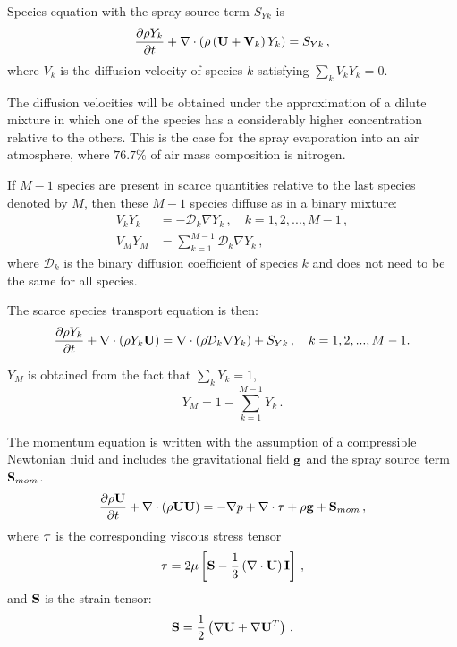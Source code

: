 Species equation with the spray source term $S_{Yk}$ is
\begin{equation}\label{ns: species}
\frac{\partial \rho Y_k }{\partial t} + \nabla \cdot \left( \rho \left( \bv{U} +
\bv{V}_{k}\right) Y_k \right) = S_{Yk} \, ,
\end{equation} where $V_k$ is the diffusion velocity of species $k$ satisfying
$\sum_{k} V_k Y_k = 0$.

The diffusion velocities will be obtained under the approximation of a dilute
mixture in which one of the species has a considerably higher concentration
relative to the others. This is the case for the spray evaporation into an air
atmosphere, where $76.7\%$ of air mass composition is nitrogen.

If $M-1$ species are present in scarce quantities relative to the last species
denoted by $M$, then these $M-1$ species diffuse as in a binary mixture:
\begin{subequations}\label{eq: byndiff}
\begin{align}
V_k Y_k &= -\mathcal{D}_k \nabla Y_k \, , \quad k=1,2,...,M-1 \, ,\\
V_M Y_M &=  \sum_{k=1}^{M-1} \mathcal{D}_k \nabla Y_k \, ,
\end{align}
\end{subequations}
where $\mathcal{D}_k$ is the binary diffusion coefficient of species $k$ and does not need
to be the same for all species.

The scarce species transport equation is then:
\begin{equation}
 \frac{\partial \rho Y_k }{\partial t} + \nabla \cdot\left( \rho Y_k \mathbf{U}
\right) = \nabla \cdot \left( \rho \mathcal{D}_k\nabla Y_k \right) +S_{Yk}
\, , \quad k=1,2,...,M-1.
\end{equation}


$Y_M$ is obtained from the fact that $\sum_k Y_k =1$,
\begin{equation}
Y_M = 1-\sum_{k=1}^{M-1} Y_k \, .
\end{equation}

The momentum equation is written with the assumption of a compressible Newtonian
fluid \cite{batchelor2000introduction} and includes the gravitational field
$\mathbf{g}$ and the spray source term $\mathbf{S}_{mom}$.
\begin{equation}\label{ns: momentum}
\frac{\partial \rho \bv{U} }{\partial t} + \nabla \cdot \left(\rho \bv{U}\bv{U}
\right) = -\nabla p + \nabla \cdot \bv{\tau} +\rho \bv{g}+\bv{S}_{mom} \, ,
\end{equation} where $\mathbf{\tau}$ is the corresponding viscous stress tensor
\begin{equation}
\mathbf{\tau} =  2\mu  \left[ \mathbf{S} -\frac{1}{3} \left( \nabla \cdot \mathbf{U}
\right)\mathbf{I} \right]\, ,
\end{equation}
and 
$\mathbf{S}$ is the strain tensor:
\begin{equation}
\mathbf{S} = \frac{1}{2} \left( \nabla\mathbf{U} + \nabla \mathbf{U}^{T} \right) \, .
\end{equation}

